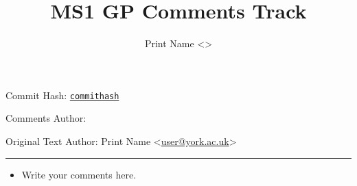 \documentclass{article}
\author{Print Name \textless\yorkemail{user}\textgreater}
\title{MS1 GP Comments Track}
\makeatletter
\newcommand{\originalauthor}{Print Name \textless\yorkemail{user}\textgreater}
\newcommand{\commithashlong}{commithash}
\newcommand{\originaltexfile}{./file.tex}
\newcommand{\printoriginal}{%
        \clearpage
        \section*{Original Copy (Rendered)}
        \begin{linenumbers}
                
        \end{linenumbers}
        \section*{Original Copy (Source)}
        \inputminted{latex}{\originaltexfile}
}
\renewcommand{\headrulewidth}{.5pt}
\newcommand{\yorkemail}[1]{\href{mailto:#1@york.ac.uk}{#1@york.ac.uk}}
\newcommand{\commitref}[1]{\href{https://github.com/oliverdixon/MS1GP/%
        commit/\commithashlong}{\texttt{#1}}}
\newcommand{\subtitle}{%
        \vspace{-.3\baselineskip}
        \begin{center}
                Commit Hash: \commitref{\commithashlong}
                \vspace{.3\baselineskip}

                Comments Author: \@author

                Original Text Author: \originalauthor
        \end{center}
        \vspace{2\baselineskip}
        \par\vspace{-2em}\noindent\rule{\textwidth}{\headrulewidth}\vspace{1em}
}
\makeatother
\begin{document}
\thispagestyle{title}
\pagestyle{fancy}
\makeatletter
\section*{\@title}
\makeatother
\subtitle
\begin{itemize}
        \item Write your comments here.
\end{itemize}
\end{document}
